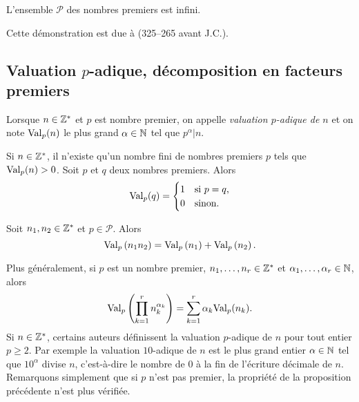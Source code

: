\documentclass{magnolia}
\begin{document}
\begin{proposition}
L'ensemble $\mathcal{P}$ des nombres premiers est infini.
\end{proposition}

\begin{remarqueUnique}
\remarque Cette démonstration est due à  (325--265 avant J.C.).
\end{remarqueUnique}

\subsection{Valuation $p$-adique, décomposition en facteurs premiers}

\begin{definition}
Lorsque $n\in\mathbb{Z}^*$ et $p$ est nombre premier, on appelle \emph{valuation
$p$-adique de $n$} et on note ${\rm Val}_p(n)$ le plus grand
$\alpha\in\mathbb{N}$ tel que $p^\alpha|n$.
\end{definition}

\begin{remarques}
\remarque Si $n\in\mathbb{Z}^*$, il n'existe qu'un nombre fini de nombres premiers $p$ tels que
  ${\rm Val}_p(n)> 0$.
\remarque Soit $p$ et $q$ deux nombres premiers. Alors
  \[{\rm Val}_p(q)=\begin{cases}
    1 & \text{si $p=q$,}\\
    0 & \text{sinon.}
  \end{cases}\]
\end{remarques}

\begin{proposition}
Soit $n_1,n_2\in\mathbb{Z}^*$ et $p\in\mathcal{P}$. Alors
\[{\rm Val}_p\left(n_1 n_2\right)={\rm Val}_p\left(n_1\right)+{\rm Val}_p\left(n_2\right).\]
\end{proposition}

\begin{remarques}
\remarque Plus généralement, si $p$ est un nombre premier, $n_1,\ldots,n_r\in\mathbb{Z}^*$ et $\alpha_1,\ldots,\alpha_r\in\mathbb{N}$, alors
  \[{\rm Val}_p\left(\prod_{k=1}^r n_k^{\alpha_k}\right)=\sum_{k=1}^r \alpha_k {\rm Val}_p(n_k).\]
\remarque Si $n\in\mathbb{Z}^*$, certains auteurs définissent la valuation $p$-adique de $n$ pour tout entier $p\geq 2$. Par exemple
  la valuation $10$-adique de $n$ est le plus grand entier $\alpha\in\mathbb{N}$ tel que $10^\alpha$ divise $n$, c'est-à-dire
  le nombre de 0 à la fin de l'écriture décimale de $n$. Remarquons simplement que si $p$ n'est pas premier, la propriété de
  la proposition précédente n'est plus vérifiée.
\end{remarques}
\end{document}
